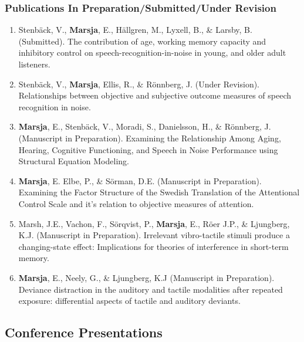 \documentclass[]{article}
\begin{document}
\hypertarget{publications-in-preparationsubmittedunder-revision}{%
\subsubsection{Publications In Preparation/Submitted/Under
Revision}\label{publications-in-preparationsubmittedunder-revision}}

\begin{enumerate}
\def\labelenumi{\arabic{enumi}.}
\item
  Stenbäck, V., \textbf{Marsja}, E., Hällgren, M., Lyxell, B., \&
  Larsby, B. (Submitted). The contribution of age, working memory
  capacity and inhibitory control on speech-recognition-in-noise in
  young, and older adult listeners.
\item
  Stenbäck, V., \textbf{Marsja}, Ellis, R., \& Rönnberg, J. (Under
  Revision). Relationships between objective and subjective outcome
  measures of speech recognition in noise.
\item
  \textbf{Marsja}, E., Stenbäck, V., Moradi, S., Danielsson, H., \&
  Rönnberg, J. (Manuscript in Preparation). Examining the Relationship
  Among Aging, Hearing, Cognitive Functioning, and Speech in Noise
  Performance using Structural Equation Modeling.
\item
  \textbf{Marsja}, E. Elbe, P., \& Sörman, D.E. (Manuscript in
  Preparation). Examining the Factor Structure of the Swedish
  Translation of the Attentional Control Scale and it's relation to
  objective measures of attention.
\item
  Marsh, J.E., Vachon, F., Sörqvist, P., \textbf{Marsja}, E., Röer J.P.,
  \& Ljungberg, K.J. (Manuscript in Preparation). Irrelevant
  vibro-tactile stimuli produce a changing-state effect: Implications
  for theories of interference in short-term memory.
\item
  \textbf{Marsja}, E., Neely, G., \& Ljungberg, K.J (Manuscript in
  Preparation). Deviance distraction in the auditory and tactile
  modalities after repeated exposure: differential aspects of tactile
  and auditory deviants.
\end{enumerate}

\hypertarget{conference-presentations}{%
\subsection{Conference Presentations}\label{conference-presentations}}
\end{document}
